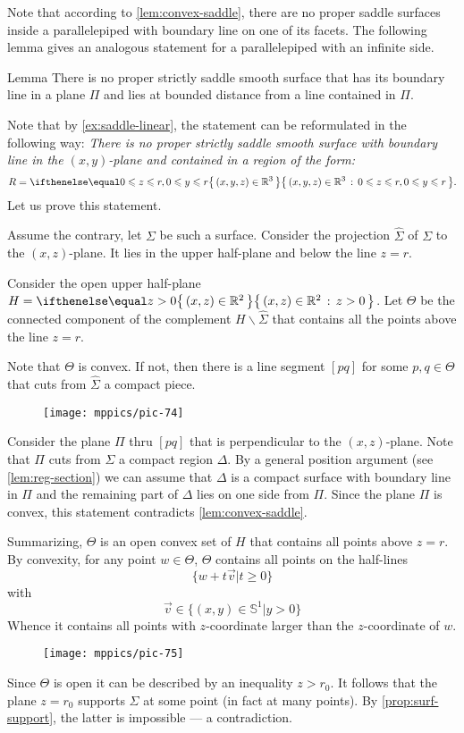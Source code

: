 Note that according to \ref{lem:convex-saddle}, there are no proper saddle surfaces inside  a parallelepiped with boundary line on one of its facets.
The following lemma gives an analogous statement for a parallelepiped with an infinite side.

\begin{thm}{Lemma}\label{lem:region}
There is no proper strictly saddle smooth surface that has its boundary line in a plane $\Pi$ 
and lies at bounded distance from a line contained in $\Pi$.
\end{thm}


Note that by \ref{ex:saddle-linear}, the statement can be reformulated in the following way:
\emph{There is no proper strictly saddle smooth surface 
with  boundary line in the $(x,y)$-plane
and contained in a region of the form:}
\[R=\set{(x,y,z)\in\RR^3}{0\le z\le r, 0\le y\le r}.\]
Let us prove this statement.

Assume the contrary, let $\Sigma$ be such a surface.
Consider the projection $\hat \Sigma$ of $\Sigma$ to the $(x,z)$-plane.
It lies in the upper half-plane and below the line $z=r$.

Consider the open upper half-plane $H=\set{(x,z)\in \RR^2}{z> 0}$. 
Let $\Theta$ be the connected component of the complement $H\backslash \hat \Sigma$ that contains all the points above the line $z=r$.

Note that $\Theta$ is convex.
If not, then there is a line segment $[pq]$ for some $p,q\in \Theta$ that cuts from $\hat\Sigma$ a compact piece.
\begin{figure}[h!]
\vskip-0mm
\centering
\texttt{[image: mppics/pic-74]}
\vskip0mm
\end{figure}
Consider the plane $\Pi$ thru $[pq]$ that is perpendicular to the $(x,z)$-plane.
Note that $\Pi$ cuts from $\Sigma$ a compact region $\Delta$.
By a general position argument (see \ref{lem:reg-section}) 
we can assume that $\Delta$ is a compact surface with boundary line in $\Pi$ and the remaining part of $\Delta$ lies on one side from $\Pi$.
Since the plane $\Pi$ is convex, this statement contradicts \ref{lem:convex-saddle}.

Summarizing, $\Theta$ is an open convex set of $H$ that contains all points above $z=r$.
By convexity, for any point $w\in \Theta$, $\Theta$ contains all points on the half-lines 
\[  \{  w+ t \vec v |  t \geq 0   \}   \]
 with 
 \[ \vec v  \in \{  (x,y) \in \mathbb{S}^1  | y  > 0   \}  \]
Whence it contains all points with $z$-coordinate larger than the $z$-coordinate of $w$.
\begin{figure}[h!]
\vskip-0mm
\centering
\texttt{[image: mppics/pic-75]}
\vskip0mm
\end{figure}
Since $\Theta$ is open it can be described by an inequality $z>r_0$.
It follows that the plane $z=r_0$ supports $\Sigma$ at some point (in fact at many points).
By \ref{prop:surf-support}, the latter is impossible --- a contradiction.
\qeds

